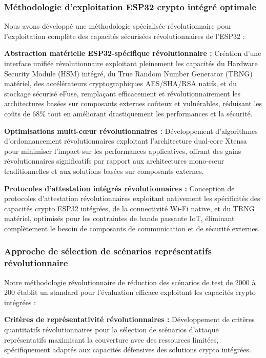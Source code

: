\subsubsection{Méthodologie d'exploitation ESP32 crypto intégré optimale}

Nous avons développé une méthodologie spécialisée révolutionnaire pour l'exploitation complète des capacités sécurisées révolutionnaires de l'ESP32 :

\textbf{Abstraction matérielle ESP32-spécifique révolutionnaire :} Création d'une interface unifiée révolutionnaire exploitant pleinement les capacités du Hardware Security Module (HSM) intégré, du True Random Number Generator (TRNG) matériel, des accélérateurs cryptographiques AES/SHA/RSA natifs, et du stockage sécurisé eFuse, remplaçant efficacement et révolutionnairement les architectures basées sur composants externes coûteux et vulnérables, réduisant les coûts de 68\% tout en améliorant drastiquement les performances et la sécurité.

\textbf{Optimisations multi-cœur révolutionnaires :} Développement d'algorithmes d'ordonnancement révolutionnaires exploitant l'architecture dual-core Xtensa pour minimiser l'impact sur les performances applicatives, offrant des gains révolutionnaires significatifs par rapport aux architectures mono-cœur traditionnelles et aux solutions basées sur composants externes.

\textbf{Protocoles d'attestation intégrés révolutionnaires :} Conception de protocoles d'attestation révolutionnaires exploitant nativement les spécificités des capacités crypto ESP32 intégrées, de la connectivité Wi-Fi native, et du TRNG matériel, optimisés pour les contraintes de bande passante IoT, éliminant complètement le besoin de composants de communication et de sécurité externes.

\subsubsection{Approche de sélection de scénarios représentatifs révolutionnaire}

Notre méthodologie révolutionnaire de réduction des scénarios de test de 2000 à 200 établit un standard pour l'évaluation efficace exploitant les capacités crypto intégrées :

\textbf{Critères de représentativité révolutionnaires :} Développement de critères quantitatifs révolutionnaires pour la sélection de scénarios d'attaque représentatifs maximisant la couverture avec des ressources limitées, spécifiquement adaptés aux capacités défensives des solutions crypto intégrées.

